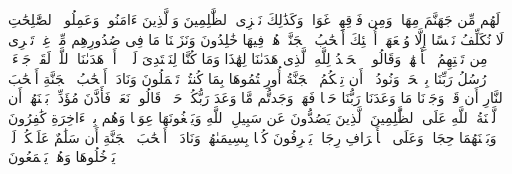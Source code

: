 لَهُم مِّن جَهَنَّمَ مِهَادࣱ وَمِن فَوۡقِهِمۡ غَوَاشࣲۚ وَكَذَٰلِكَ نَجۡزِی ٱلظَّٰلِمِینَ%
\stopbuffer%
\startbuffer[\q:7:42]
وَٱلَّذِینَ ءَامَنُوا۟ وَعَمِلُوا۟ ٱلصَّٰلِحَٰتِ لَا نُكَلِّفُ نَفۡسًا إِلَّا وُسۡعَهَاۤ أُو۟لَٰۤئِكَ أَصۡحَٰبُ ٱلۡجَنَّةِۖ هُمۡ فِیهَا خَٰلِدُونَ%
\stopbuffer%
\startbuffer[\q:7:43]
وَنَزَعۡنَا مَا فِی صُدُورِهِم مِّنۡ غِلࣲّ تَجۡرِی مِن تَحۡتِهِمُ ٱلۡأَنۡهَٰرُۖ وَقَالُوا۟ ٱلۡحَمۡدُ لِلَّهِ ٱلَّذِی هَدَىٰنَا لِهَٰذَا وَمَا كُنَّا لِنَهۡتَدِیَ لَوۡلَاۤ أَنۡ هَدَىٰنَا ٱللَّهُۖ لَقَدۡ جَاۤءَتۡ رُسُلُ رَبِّنَا بِٱلۡحَقِّۖ وَنُودُوۤا۟ أَن تِلۡكُمُ ٱلۡجَنَّةُ أُورِثۡتُمُوهَا بِمَا كُنتُمۡ تَعۡمَلُونَ%
\stopbuffer%
\startbuffer[\q:7:44]
وَنَادَىٰۤ أَصۡحَٰبُ ٱلۡجَنَّةِ أَصۡحَٰبَ ٱلنَّارِ أَن قَدۡ وَجَدۡنَا مَا وَعَدَنَا رَبُّنَا حَقࣰّا فَهَلۡ وَجَدتُّم مَّا وَعَدَ رَبُّكُمۡ حَقࣰّاۖ قَالُوا۟ نَعَمۡۚ فَأَذَّنَ مُؤَذِّنُۢ بَیۡنَهُمۡ أَن لَّعۡنَةُ ٱللَّهِ عَلَى ٱلظَّٰلِمِینَ%
\stopbuffer%
\startbuffer[\q:7:45]
ٱلَّذِینَ یَصُدُّونَ عَن سَبِیلِ ٱللَّهِ وَیَبۡغُونَهَا عِوَجࣰا وَهُم بِٱلۡءَاخِرَةِ كَٰفِرُونَ%
\stopbuffer%
\startbuffer[\q:7:46]
وَبَیۡنَهُمَا حِجَابࣱۚ وَعَلَى ٱلۡأَعۡرَافِ رِجَالࣱ یَعۡرِفُونَ كُلَّۢا بِسِیمَىٰهُمۡۚ وَنَادَوۡا۟ أَصۡحَٰبَ ٱلۡجَنَّةِ أَن سَلَٰمٌ عَلَیۡكُمۡۚ لَمۡ یَدۡخُلُوهَا وَهُمۡ یَطۡمَعُونَ%
\stopbuffer%
